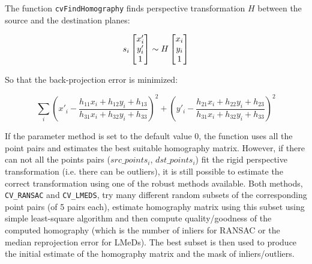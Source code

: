 \begin{description}
\end{description}

The function \texttt{cvFindHomography} finds perspective transformation $H$ between the source and the destination planes:

\[
s_i \begin{bmatrix} x'_i\\ y'_i\\ 1 \end{bmatrix} \sim H \begin{bmatrix} x_i\\ y_i\\ 1 \end{bmatrix}
\]

So that the back-projection error is minimized:

\[
\sum_i
\left( x'_i-\frac{h_{11} x_i + h_{12} y_i + h_{13}}{h_{31} x_i + h_{32} y_i + h_{33}} \right)^2+
\left( y'_i-\frac{h_{21} x_i + h_{22} y_i + h_{23}}{h_{31} x_i + h_{32} y_i + h_{33}} \right)^2
\]

If the parameter method is set to the default value 0, the function
uses all the point pairs and estimates the best suitable homography
matrix. However, if there can not all the points pairs ($src\_points_i$,
$dst\_points_i$) fit the rigid perspective transformation (i.e. there
can be outliers), it is still possible to estimate the correct
transformation using one of the robust methods available. Both
methods, \texttt{CV\_RANSAC} and \texttt{CV\_LMEDS}, try many different random subsets
of the corresponding point pairs (of 5 pairs each), estimate
homography matrix using this subset using simple least-square
algorithm and then compute quality/goodness of the computed homography
(which is the number of inliers for RANSAC or the median reprojection
error for LMeDs). The best subset is then used to produce the initial
estimate of the homography matrix and the mask of inliers/outliers.

